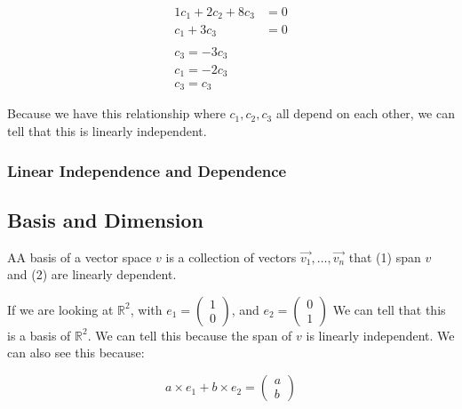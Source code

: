 \begin{problem}
    \begin{align*}
      1c_1+2c_2+8c_3&=0\\
      c_1+3c_3&=0\\\\
      c_3=-3c_3\\
      c_1=-2c_3\\
      c_3=c_3  
    \end{align*}

    Because we have this relationship where $c_1,c_2,c_3$ all depend on each other, we can tell that this is linearly independent.
  \end{problem}

  \subsubsection{Linear Independence and Dependence}
  
\subsection{Basis and Dimension}
  \begin{definition}
    AA basis of a vector space $v$ is a collection of vectors $\vec{v_1},\dots,\vec{v_n}$ that (1) span $v$ and (2) are linearly dependent.
  \end{definition}

  \begin{problem}
    If we are looking at $\mathbb{R}^2$, with $e_1=\left(\begin{smallmatrix}1\\0\end{smallmatrix}\right)$, and $e_2=\left(\begin{smallmatrix}0\\1\end{smallmatrix}\right)$
    We can tell that this is a basis of $\mathbb{R}^2$. We can tell this because the span of $v$ is linearly independent. We can also see this because:

    \[
      a\times e_1+b\times e_2=\begin{pmatrix}a\\b\end{pmatrix}
    \]
  \end{problem}

